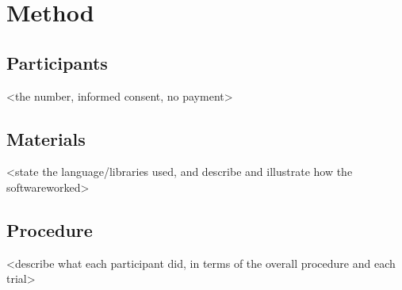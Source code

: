 \section{Method}

\subsection{Participants}
<the number, informed consent, no payment>

\subsection{Materials}
<state the language/libraries used, and describe and illustrate how the softwareworked>

\subsection{Procedure}
<describe what each participant did, in terms of the overall procedure and each trial>
